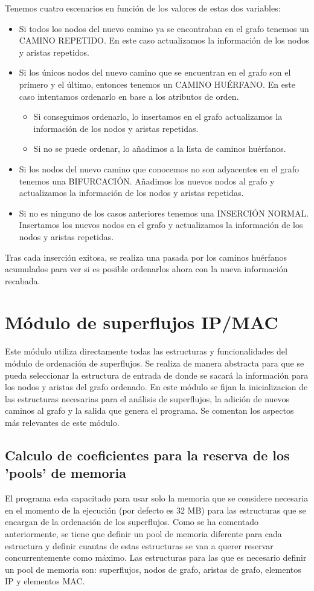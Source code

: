 \documentclass[twoside, 12pt]{epstfg}
\begin{document}
Tenemos cuatro escenarios en función de los valores de estas dos variables:
\begin{itemize}
    \item Si todos los nodos del nuevo camino ya se encontraban en el grafo tenemos un CAMINO REPETIDO. En este caso actualizamos la información de los nodos y aristas repetidos.
    \item Si los únicos nodos del nuevo camino que se encuentran en el grafo son el primero y el último, entonces tenemos un CAMINO HUÉRFANO. En este caso intentamos ordenarlo en base a los atributos de orden.
    \begin{itemize}
        \item Si conseguimos ordenarlo, lo insertamos en el grafo actualizamos la información de los nodos y aristas repetidas.
        \item Si no se puede ordenar, lo añadimos a la lista de caminos huérfanos.
    \end{itemize}
    \item Si los nodos del nuevo camino que conocemos no son adyacentes en el grafo tenemos una BIFURCACIÓN. Añadimos los nuevos nodos al grafo y actualizamos la información de los nodos y aristas repetidas.
    \item Si no es ninguno de los casos anteriores tenemos una INSERCIÓN NORMAL. Insertamos los nuevos nodos en el grafo y actualizamos la información de los nodos y aristas repetidas.
\end{itemize}
Tras cada inserción exitosa, se realiza una pasada por los caminos huérfanos acumulados para ver si es posible ordenarlos ahora con la nueva información recabada.


\section{Módulo de superflujos IP/MAC}
Este módulo utiliza directamente todas las estructuras y funcionalidades del módulo de ordenación de superflujos. Se realiza de manera abstracta para que se pueda seleccionar la estructura de entrada de donde se sacará la información para los nodos y aristas del grafo ordenado. En este módulo se fijan la inicializacion de las estructuras necesarias para el análisis de superflujos, la adición de nuevos caminos al grafo y la salida que genera el programa. Se comentan los aspectos más relevantes de este módulo.

\subsection{Calculo de coeficientes para la reserva de los 'pools' de memoria}
El programa esta capacitado para usar solo la memoria que se considere necesaria en el momento de la ejecución (por defecto es 32 MB) para las estructuras que se encargan de la ordenación de los superflujos. Como se ha comentado anteriormente, se tiene que definir un pool de memoria diferente para cada estructura y definir cuantas de estas estructuras se van a querer reservar concurrentemente como máximo. Las estructuras para las que es necesario definir un pool de memoria son: superflujos, nodos de grafo, aristas de grafo, elementos IP y elementos MAC. 
\end{document}
